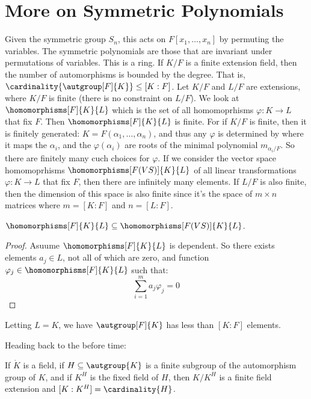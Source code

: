 \documentclass{article}                                                        %
\begin{document}
    \section{More on Symmetric Polynomials}
        Given the symmetric group $S_{n}$, this acts on $F[x_{1},\dots,x_{n}]$
        by permuting the variables. The symmetric polynomials are those that are
        invariant under permutations of variables. This is a ring.
        If $K/F$ is a finite extension field, then the number of automorphisms
        is bounded by the degree. That is,
        $\cardinality{\autgroup[F]{K}}\leq[K:F]$. Let $K/F$ and $L/F$ are
        extensions, where $K/F$ is finite (there is no constraint on $L/F$). We
        look at $\homomorphisms[F]{K}{L}$ which is the set of all homomoprhisms
        $\varphi:K\rightarrow{L}$ that fix $F$. Then $\homomorphisms[F]{K}{L}$
        is finite. For if $K/F$ is finite, then it is finitely generated:
        $K=F(\alpha_{1},\dots,\alpha_{n})$, and thus any $\varphi$ is determined
        by where it maps the $\alpha_{i}$, and the $\varphi(\alpha_{i})$ are
        roots of the minimal polynomial $m_{\alpha_{i}/F}$. So there are
        finitely many cuch choices for $\varphi$. If we consider the vector
        space homomoprhisms $\homomorphisms[F(VS)]{K}{L}$ of all linear
        transformations $\varphi:K\rightarrow{L}$ that fix $F$, then there are
        infinitely many elements. If $L/F$ is also finite, then the dimension
        of this space is also finite since it's the space of $m\times{n}$
        matrices where $m=[K:F]$ and $n=[L:F]$.
        \begin{theorem}
            $\homomorphisms[F]{K}{L}\subseteq\homomorphisms[F(VS)]{K}{L}$.
        \end{theorem}
        \begin{proof}
            Asuume $\homomorphisms[F]{K}{L}$ is dependent. So there exists
            elements $a_{j}\in{L}$, not all of which are zero, and function
            $\varphi_{j}\in\homomorphisms[F]{K}{L}$ such that:
            \begin{equation}
                \sum_{i=1}^{m}a_{j}\varphi_{j}=0
            \end{equation}
        \end{proof}
        \begin{theorem}
            Letting $L=K$, we have $\autgroup[F]{K}$ has less than $[K:F]$
            elements.
        \end{theorem}
        Heading back to the before time:
        \begin{theorem}
            If $\ring{K}$ is a field, if $H\subseteq\autgroup{K}$ is a finite
            subgroup of the automorphism group of $K$, and if $K^{H}$ is the
            fixed field of $H$, then $K/K^{H}$ is a finite field extension and
            $[K:K^{H}]=\cardinality{H}$.
        \end{theorem}
\end{document}
